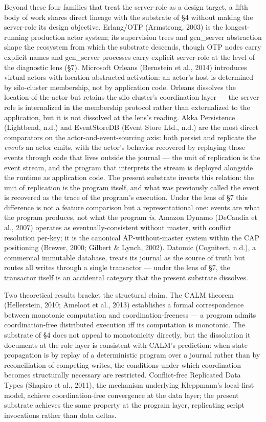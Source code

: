 \documentclass[
]{article}
\begin{document}
Beyond these four families that treat the server-role as a design
target, a fifth body of work shares direct lineage with the substrate of
§4 without making the server-role its design objective. Erlang/OTP
(Armstrong, 2003) is the longest-running production actor system; its
supervision trees and gen\_server abstraction shape the ecosystem from
which the substrate descends, though OTP nodes carry explicit names and
gen\_server processes carry explicit server-role at the level of the
diagnostic lens (§7). Microsoft Orleans (Bernstein et al., 2014)
introduces virtual actors with location-abstracted activation: an
actor's host is determined by silo-cluster membership, not by
application code. Orleans dissolves the location-of-the-actor but
retains the silo cluster's coordination layer --- the server-role is
internalized in the membership protocol rather than externalized to the
application, but it is not dissolved at the lens's reading. Akka
Persistence (Lightbend, n.d.) and EventStoreDB (Event Store Ltd., n.d.)
are the most direct comparators on the actor-and-event-sourcing axis:
both persist and replicate the \emph{events} an actor emits, with the
actor's behavior recovered by replaying those events through code that
lives outside the journal --- the unit of replication is the event
stream, and the program that interprets the stream is deployed alongside
the runtime as application code. The present substrate inverts this
relation: the unit of replication is the program itself, and what was
previously called the event is recovered as the trace of the program's
execution. Under the lens of §7 this difference is not a feature
comparison but a representational one: events are what the program
produces, not what the program \emph{is}. Amazon Dynamo (DeCandia et
al., 2007) operates as eventually-consistent without master, with
conflict resolution per-key; it is the canonical AP-without-master
system within the CAP positioning (Brewer, 2000; Gilbert \& Lynch,
2002). Datomic (Cognitect, n.d.), a commercial immutable database,
treats its journal as the source of truth but routes all writes through
a single transactor --- under the lens of §7, the transactor itself is
an accidental category that the present substrate dissolves.

Two theoretical results bracket the structural claim. The CALM theorem
(Hellerstein, 2010; Ameloot et al., 2013) establishes a formal
correspondence between monotonic computation and coordination-freeness
--- a program admits coordination-free distributed execution iff its
computation is monotonic. The substrate of §4 does not appeal to
monotonicity directly, but the dissolution it documents at the role
layer is consistent with CALM's prediction: when state propagation is by
replay of a deterministic program over a journal rather than by
reconciliation of competing writes, the conditions under which
coordination becomes structurally necessary are restricted.
Conflict-free Replicated Data Types (Shapiro et al., 2011), the
mechanism underlying Kleppmann's local-first model, achieve
coordination-free convergence at the data layer; the present substrate
achieves the same property at the program layer, replicating script
invocations rather than data deltas.
\end{document}

